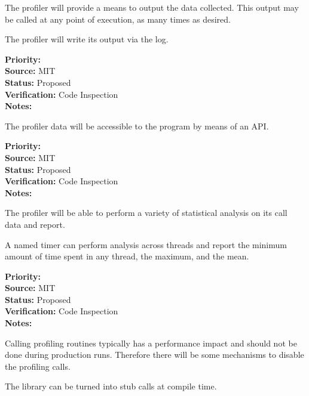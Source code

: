 The profiler will provide a means to output the data collected.  This output may
be called at any point of execution, as many times as desired.


The profiler will write its output via the log.  

\begin{reqlist}
{\bf Priority:}  \\
{\bf Source:}  MIT \\
{\bf Status:} Proposed \\
{\bf Verification:} Code Inspection \\
{\bf Notes:} 
\end{reqlist}


The profiler data will be accessible to the program by means of an API.
\begin{reqlist}
{\bf Priority:}  \\
{\bf Source:} MIT  \\
{\bf Status:} Proposed \\
{\bf Verification:} Code Inspection \\
{\bf Notes:} 
\end{reqlist}


The profiler will be able to perform a variety of statistical analysis on its call
data and report.


A named timer can perform analysis across threads and report the 
minimum amount of time spent in any thread, the maximum, and the mean.

\begin{reqlist}
{\bf Priority:}  \\
{\bf Source:}  MIT \\
{\bf Status:} Proposed \\
{\bf Verification:} Code Inspection \\
{\bf Notes:} 
\end{reqlist}


Calling profiling routines typically has a performance impact and should not
be done during production runs.  Therefore there will be some mechanisms to 
disable the profiling calls.


The library can be turned into stub calls at compile time.

